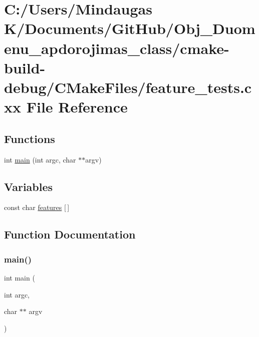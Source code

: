 \hypertarget{cmake-build-debug_2_c_make_files_2feature__tests_8cxx}{}\section{C\+:/\+Users/\+Mindaugas K/\+Documents/\+Git\+Hub/\+Obj\+\_\+\+Duomenu\+\_\+apdorojimas\+\_\+class/cmake-\/build-\/debug/\+C\+Make\+Files/feature\+\_\+tests.cxx File Reference}
\label{cmake-build-debug_2_c_make_files_2feature__tests_8cxx}
\subsection*{Functions}
\begin{DoxyCompactItemize}
\item 
int \mbox{\hyperlink{cmake-build-debug_2_c_make_files_2feature__tests_8cxx_a3c04138a5bfe5d72780bb7e82a18e627}{main}} (int argc, char $\ast$$\ast$argv)
\end{DoxyCompactItemize}
\subsection*{Variables}
\begin{DoxyCompactItemize}
\item 
const char \mbox{\hyperlink{cmake-build-debug_2_c_make_files_2feature__tests_8cxx_a1582568e32f689337602a16bf8a5bff0}{features}} \mbox{[}$\,$\mbox{]}
\end{DoxyCompactItemize}


\subsection{Function Documentation}
\mbox{\label{cmake-build-debug_2_c_make_files_2feature__tests_8cxx_a3c04138a5bfe5d72780bb7e82a18e627}} 
\subsubsection{\texorpdfstring{main()}{main()}}
{\footnotesize\ttfamily int main (\begin{DoxyParamCaption}\item[{int}]{argc,  }\item[{char $\ast$$\ast$}]{argv }\end{DoxyParamCaption})}



